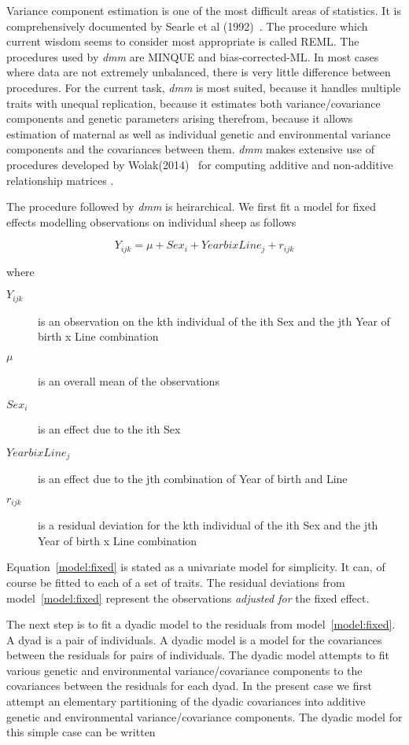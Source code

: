 \documentclass[titlepage]{article}  %
\begin{document}
Variance component estimation is one of the most difficult areas of statistics. It is comprehensively documented by Searle et al (1992)~\cite{sear:92}. The procedure which current wisdom seems to consider most appropriate is called REML. The procedures used by {\em dmm} are MINQUE and bias-corrected-ML. In most cases where data are not extremely unbalanced, there is very little difference between procedures.  For the current task, {\em dmm} is most suited, because it handles multiple traits with unequal replication, because it estimates both variance/covariance components and genetic parameters arising therefrom, because it allows estimation of maternal as well as individual genetic and environmental variance components and the covariances between them.  {\em dmm} makes extensive use of procedures developed by Wolak(2014)~\cite{wola:14} for computing additive and non-additive relationship matrices .

The procedure followed by {\em dmm} is heirarchical. We first fit a model for fixed effects modelling observations on individual sheep as follows

\begin{equation}
\label{model:fixed}
Y_{ijk} = \mu + Sex_{i} + YearbixLine_{j} + r_{ijk}
\end{equation}

where
\begin{description}
\item[$Y_{ijk}$] is an observation on the kth individual of the ith Sex and the jth Year of birth x Line combination
\item[$\mu$] is an overall mean of the observations
\item[$Sex_{i}$] is an effect due to the ith Sex
\item[$YearbixLine_{j}$] is an effect due to the jth combination of Year of birth and Line
\item[$r_{ijk}$] is a residual deviation for the kth individual of the ith Sex and the jth Year of birth x Line combination
\end{description}

Equation~\ref{model:fixed} is stated as a univariate model for simplicity. It can, of course be fitted to each of a set of traits. The residual deviations from model~\ref{model:fixed} represent the observations {\em adjusted for} the fixed effect.

The next step is to fit a dyadic model to the residuals from model~\ref{model:fixed}. A dyad is a pair of individuals. A dyadic model is a model for the covariances between the residuals for pairs of individuals. The dyadic model attempts to fit various genetic and environmental variance/covariance components to the covariances between the residuals for each dyad. In the present case we first attempt an elementary partitioning of the dyadic covariances into additive genetic and environmental variance/covariance components. The dyadic model for this simple case can be written
\end{document}
